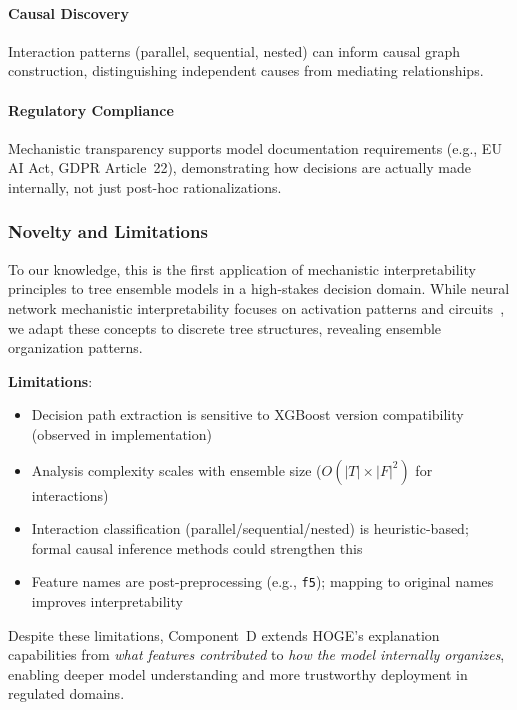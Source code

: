 \paragraph{Causal Discovery}
Interaction patterns (parallel, sequential, nested) can inform causal graph construction, distinguishing independent causes from mediating relationships.

\paragraph{Regulatory Compliance}
Mechanistic transparency supports model documentation requirements (e.g., EU AI Act, GDPR Article~22), demonstrating how decisions are actually made internally, not just post-hoc rationalizations.

\subsubsection{Novelty and Limitations}

To our knowledge, this is the first application of mechanistic interpretability principles to tree ensemble models in a high-stakes decision domain. While neural network mechanistic interpretability focuses on activation patterns and circuits~\cite{olah2020,anthropic2023}, we adapt these concepts to discrete tree structures, revealing ensemble organization patterns.

\textbf{Limitations}:
\begin{itemize}
    \item Decision path extraction is sensitive to XGBoost version compatibility (observed in implementation)
    \item Analysis complexity scales with ensemble size ($O(|T| \times |F|^2)$ for interactions)
    \item Interaction classification (parallel/sequential/nested) is heuristic-based; formal causal inference methods could strengthen this
    \item Feature names are post-preprocessing (e.g., \texttt{f5}); mapping to original names improves interpretability
\end{itemize}

Despite these limitations, Component~D extends HOGE's explanation capabilities from \emph{what features contributed} to \emph{how the model internally organizes}, enabling deeper model understanding and more trustworthy deployment in regulated domains.
